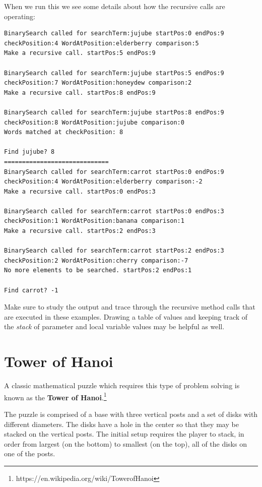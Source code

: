 When we run this we see some details about how the recursive calls are operating:

\beforeverb
\begin{verbatim}
BinarySearch called for searchTerm:jujube startPos:0 endPos:9
checkPosition:4 WordAtPosition:elderberry comparison:5
Make a recursive call. startPos:5 endPos:9

BinarySearch called for searchTerm:jujube startPos:5 endPos:9
checkPosition:7 WordAtPosition:honeydew comparison:2
Make a recursive call. startPos:8 endPos:9

BinarySearch called for searchTerm:jujube startPos:8 endPos:9
checkPosition:8 WordAtPosition:jujube comparison:0
Words matched at checkPosition: 8

Find jujube? 8
=============================
BinarySearch called for searchTerm:carrot startPos:0 endPos:9
checkPosition:4 WordAtPosition:elderberry comparison:-2
Make a recursive call. startPos:0 endPos:3

BinarySearch called for searchTerm:carrot startPos:0 endPos:3
checkPosition:1 WordAtPosition:banana comparison:1
Make a recursive call. startPos:2 endPos:3

BinarySearch called for searchTerm:carrot startPos:2 endPos:3
checkPosition:2 WordAtPosition:cherry comparison:-7
No more elements to be searched. startPos:2 endPos:1

Find carrot? -1
\end{verbatim}
\afterverb

Make sure to study the output and trace through the recursive method calls that are executed in these examples. Drawing a table of values and keeping track of the \textit{stack} of parameter and local variable values may be helpful as well.


\iffalse

\section{Tower of Hanoi}

A classic mathematical puzzle which requires this type of problem solving is known as the \textbf{Tower of Hanoi}.\footnote{https://en.wikipedia.org/wiki/Tower\textunderscore of\textunderscore Hanoi}

The puzzle is comprised of a base with three vertical posts and a set of disks with different diameters. The disks have a hole in the center so that they may be stacked on the vertical posts. The initial setup requires the player to stack, in order from largest (on the bottom) to smallest (on the top), all of the disks on one of the posts. 

